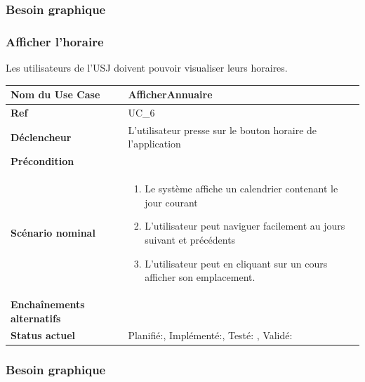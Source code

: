 			\subsubsection*{Besoin graphique}



			\subsubsection{Afficher l'horaire}
								Les utilisateurs de l'USJ  doivent pouvoir visualiser leurs horaires.\\[0.2cm]
								\begin{longtable}{|l|p{10cm}|}
									\hline \textbf{Nom du Use Case} & AfficherAnnuaire \\ 
									\hline \textbf{Ref} & UC\_6  \\ 
									\hline \textbf{Déclencheur} & L'utilisateur presse sur le bouton horaire  de l'application \\
									\hline \textbf{Précondition} &  \\
									\hline \textbf{Scénario nominal} & 
									\begin{enumerate}
										\item Le système affiche un calendrier contenant le jour courant 
										\item L'utilisateur peut naviguer facilement au jours suivant et précédents 
										\item L'utilisateur peut en cliquant sur un cours afficher son emplacement.
									\end{enumerate}
									\\ 
									\hline \textbf{Enchaînements alternatifs} & \\
									\hline \textbf{Status actuel} & Planifié:\CheckedBox , Implémenté:\CheckedBox  , Testé: \CheckedBox  , Validé: \CheckedBox	  \\
									\hline 
								\end{longtable} 
						\subsubsection*{Besoin graphique}
			
